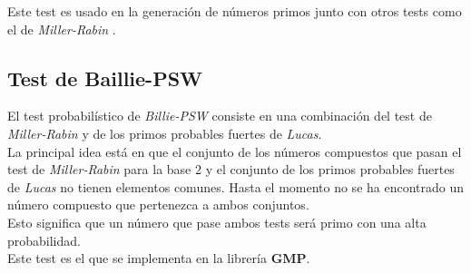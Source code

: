 Este test es usado en la generación de números primos junto con otros tests como el de \textit{Miller-Rabin} \cite{digital_signature_standard}.

\subsection{Test de Baillie-PSW}

El test probabilístico de \textit{Billie-PSW} consiste en una combinación del test de \textit{Miller-Rabin} y de los primos probables fuertes de \textit{Lucas}.\\

La principal idea está en que el conjunto de los números compuestos que pasan el test de \textit{Miller-Rabin} para la base $2$ y el conjunto de los primos probables fuertes de \textit{Lucas} no tienen elementos comunes. Hasta el momento no se ha encontrado un número compuesto que pertenezca a ambos conjuntos.\\

Esto significa que un número que pase ambos tests será primo con una alta probabilidad.\\

Este test es el que se implementa en la librería \textbf{GMP}.

\endinput
